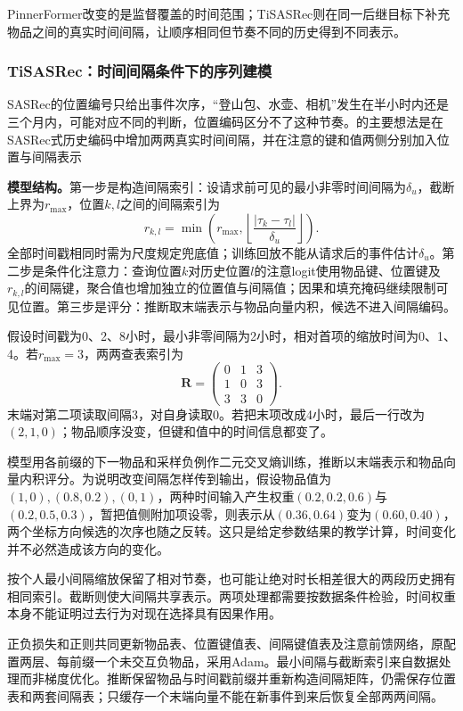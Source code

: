 PinnerFormer改变的是监督覆盖的时间范围；TiSASRec则在同一后继目标下补充物品之间的真实时间间隔，让顺序相同但节奏不同的历史得到不同表示。
\subsubsection{TiSASRec：时间间隔条件下的序列建模}
\label{sec:rs-tisasrec}

SASRec的位置编号只给出事件次序，“登山包、水壶、相机”发生在半小时内还是三个月内，可能对应不同的判断，位置编码区分不了这种节奏。的主要想法是在SASRec式历史编码中增加两两真实时间间隔，并在注意的键和值两侧分别加入位置与间隔表示

\textbf{模型结构。}第一步是构造间隔索引：设请求前可见的最小非零时间间隔为$\delta_u$，截断上界为$r_{\max}$，位置$k,l$之间的间隔索引为
\begin{equation}
  r_{k,l}=\min\left(r_{\max},
     \left\lfloor\frac{|\tau_k-\tau_l|}{\delta_u}\right\rfloor\right).
  \label{eq:rs-tisasrec-time}
\end{equation}
全部时间戳相同时需为尺度规定兜底值；训练回放不能从请求后的事件估计$\delta_u$。第二步是条件化注意力：查询位置$k$对历史位置$l$的注意logit使用物品键、位置键及$r_{k,l}$的间隔键，聚合值也增加独立的位置值与间隔值；因果和填充掩码继续限制可见位置。第三步是评分：推断取末端表示与物品向量内积，候选不进入间隔编码。

假设时间戳为0、2、8小时，最小非零间隔为2小时，相对首项的缩放时间为0、1、4。若$r_{\max}=3$，两两查表索引为
\[
  \bm{R}=
  \begin{pmatrix}0&1&3\\1&0&3\\3&3&0\end{pmatrix}.
\]
末端对第二项读取间隔3，对自身读取0。若把末项改成4小时，最后一行改为$(2,1,0)$；物品顺序没变，但键和值中的时间信息都变了。

模型用各前缀的下一物品和采样负例作二元交叉熵训练，推断以末端表示和物品向量内积评分。为说明改变间隔怎样传到输出，假设物品值为$(1,0),(0.8,0.2),(0,1)$，两种时间输入产生权重$(0.2,0.2,0.6)$与$(0.2,0.5,0.3)$，暂把值侧附加项设零，则表示从$(0.36,0.64)$变为$(0.60,0.40)$，两个坐标方向候选的次序也随之反转。这只是给定参数结果的教学计算，时间变化并不必然造成该方向的变化。

按个人最小间隔缩放保留了相对节奏，也可能让绝对时长相差很大的两段历史拥有相同索引。截断则使大间隔共享表示。两项处理都需要按数据条件检验，时间权重本身不能证明过去行为对现在选择具有因果作用。

正负损失和正则共同更新物品表、位置键值表、间隔键值表及注意前馈网络，原配置两层、每前缀一个未交互负物品，采用Adam。最小间隔与截断索引来自数据处理而非梯度优化。推断保留物品与时间戳前缀并重新构造间隔矩阵，仍需保存位置表和两套间隔表；只缓存一个末端向量不能在新事件到来后恢复全部两两间隔。

